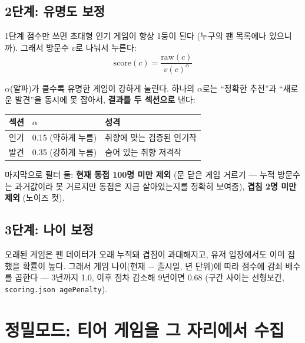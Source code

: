 \documentclass[11pt]{article}
\begin{document}
\subsection{2단계: 유명도 보정}

1단계 점수만 쓰면 초대형 인기 게임이 항상 1등이 된다 (누구의 팬 목록에나 있으니까).
그래서 방문수 $v$로 나눠서 누른다:
\begin{equation}
  \mathrm{score}(c) = \frac{\mathrm{raw}(c)}{v(c)^{\alpha}}
\end{equation}

$\alpha$(알파)가 클수록 유명한 게임이 강하게 눌린다. 하나의 $\alpha$로는
``정확한 추천''과 ``새로운 발견''을 동시에 못 잡아서, \textbf{결과를 두 섹션으로} 낸다:

\begin{center}
\begin{tabular}{lll}
\toprule
섹션 & $\alpha$ & 성격 \\
\midrule
인기 & 0.15 (약하게 누름) & 취향에 맞는 검증된 인기작 \\
발견 & 0.35 (강하게 누름) & 숨어 있는 취향 저격작 \\
\bottomrule
\end{tabular}
\end{center}

마지막으로 필터 둘: \textbf{현재 동접 100명 미만 제외} (문 닫은 게임 거르기 ---
누적 방문수는 과거값이라 못 거르지만 동접은 지금 살아있는지를 정확히 보여줌),
\textbf{겹침 2명 미만 제외} (노이즈 컷).

\subsection{3단계: 나이 보정}

오래된 게임은 팬 데이터가 오래 누적돼 겹침이 과대해지고, 유저 입장에서도 이미
접했을 확률이 높다. 그래서 게임 나이(현재 $-$ 출시일, 년 단위)에 따라 점수에
감쇠 배수를 곱한다 --- 3년까지 1.0, 이후 점차 감소해 9년이면 0.68
(구간 사이는 선형보간, \texttt{scoring.json agePenalty}).

\section{정밀모드: 티어 게임을 그 자리에서 수집}
\label{sec:precise}
\end{document}
